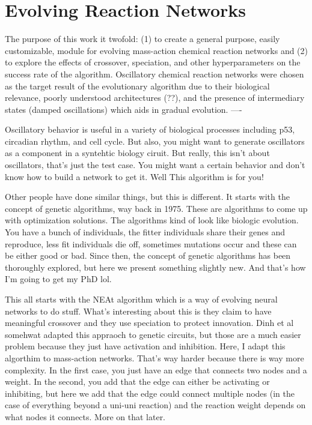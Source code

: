 \documentclass[12pt]{report}
\begin{document}
\section{Evolving Reaction Networks}
The purpose of this work it twofold: (1) to create a general purpose, easily customizable, module for evolving mass-action chemical reaction networks and (2) to explore the effects of crossover,  speciation, and other hyperparameters on the success rate of the algorithm. Oscillatory chemical reaction networks were chosen as the target result of the evolutionary algorithm due to their biological relevance, poorly understood architectures (??), and the presence of intermediary states (damped oscillations) which aids in gradual evolution.
----

Oscillatory behavior is useful in a variety of biological processes including p53, circadian rhythm, and cell cycle. But also, you might want to generate oscillators as a component in a syntehtic biology ciruit. But really, this isn't about oscillators, that's just the test case. You might want a certain behavior and don't know how to build a  network to get it. Well This algorithm is for you! 

Other people have done similar things, but this is different. It starts with the concept of genetic algorithms, way back in 1975. These are algorithms to come up with optimization solutions. The algorithms kind of look like biologic evolution. You have a bunch of individuals, the fitter individuals share their genes and reproduce, less fit individuals die off, sometimes mutations occur and these can be either good or bad. Since then, the concept of genetic algorithms has been thoroughly explored, but here we present something slightly new. And that's how I'm going to get my PhD lol.

This all starts with the NEAt algorithm which is a way of evolving neural networks to do stuff.  What's interesting about this is they claim to have meaningful crossover and they use speciation to protect innovation. Dinh et al somehwat adapted this appraoch to genetic circuits, but those are a much easier problem because they just have activation and inhibition. Here, I adapt this algorthim to mass-action networks. That's way harder because there is way more complexity. In the first case, you just have an edge that connects two nodes and a weight. In the second, you add that the edge can either be activating or inhibiting, but here we add that the edge could connect multiple nodes (in the case of everything beyond a uni-uni reaction) and the reaction weight depends on what nodes it connects. More on that later.
\end{document}
